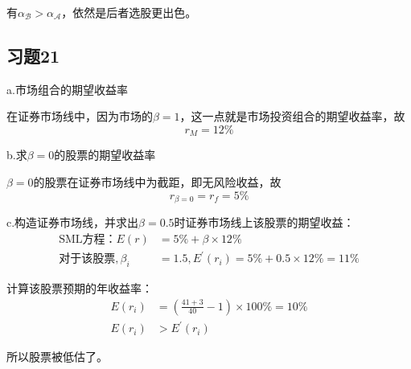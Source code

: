 \documentclass{article}
\begin{document}
有$\alpha_\mathcal{B}>\alpha_\mathcal{A}$，依然是后者选股更出色。

\clearpage
\subsection*{习题21}
a.市场组合的期望收益率

在证券市场线中，因为市场的$\beta=1$，这一点就是市场投资组合的期望收益率，故
\[r_M=12\%\]

b.求$\beta=0$的股票的期望收益率

$\beta=0$的股票在证券市场线中为截距，即无风险收益，故
\[r_{\beta=0}=r_f=5\%\]

c.构造证券市场线，并求出$\beta=0.5$时证券市场线上该股票的期望收益：
\begin{align}
    \text{SML方程：}E(r)&=5\%+\beta\times 12\%\\
    \text{对于该股票},\beta_i &=1.5,E^{\prime}(r_i )=5\%+0.5\times 12\%=11\%
\end{align}

计算该股票预期的年收益率：
\begin{align}
    E(r_i)&=(\frac{41+3}{40}-1 )\times 100\% = 10\%\\
    E(r_i)&>E^{\prime}(r_i )
\end{align}

所以股票被低估了。
\end{document}
